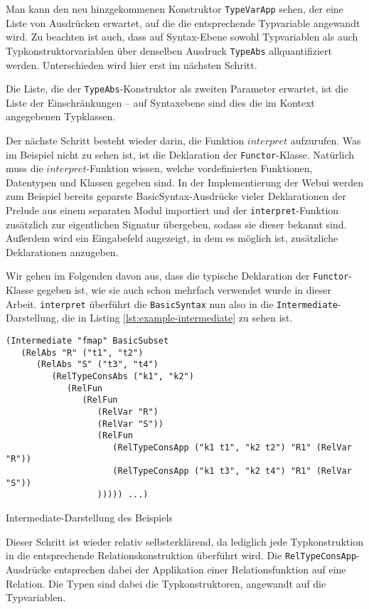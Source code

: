 Man kann den neu hinzgekommenen Konstruktor \texttt{TypeVarApp} sehen, der eine Liste von Ausdrücken erwartet, auf
die die entsprechende Typvariable angewandt wird. Zu beachten ist auch, dass auf Syntax-Ebene sowohl Typvariablen als auch
Typkonstruktorvariablen über denselben Ausdruck \texttt{TypeAbs} allquantifiziert werden. Unterschieden wird hier erst im
nächsten Schritt.

Die Liste, die der \texttt{TypeAbs}-Konstruktor als zweiten Parameter erwartet, ist die Liste der Einschränkungen -- auf Syntaxebene
sind dies die im Kontext angegebenen Typklassen.

Der nächste Schritt besteht wieder darin, die Funktion $interpret$ aufzurufen. Was im Beispiel nicht zu sehen ist, ist die
Deklaration der \texttt{Functor}-Klasse. Natürlich muss die $interpret$-Funktion wissen, welche vordefinierten Funktionen,
Datentypen und Klassen gegeben sind. In der Implementierung der Webui \cite{freetheoremswebui} werden zum Beispiel bereits
geparste BasicSyntax-Ausdrücke vieler Deklarationen der Prelude aus einem separaten Modul importiert und der
\texttt{interpret}-Funktion zusätzlich zur eigentlichen Signatur übergeben, sodass sie dieser bekannt sind.
Außerdem wird ein Eingabefeld angezeigt, in dem es möglich ist, zusätzliche Deklarationen anzugeben.

Wir gehen im Folgenden davon aus, dass die typische Deklaration der \texttt{Functor}-Klasse gegeben ist, wie sie auch schon
mehrfach verwendet wurde in dieser Arbeit.  \texttt{interpret} überführt die \texttt{BasicSyntax} nun also in die
\texttt{Intermediate}-Darstellung, die in Listing \ref{lst:example-intermediate} zu sehen ist.

\begin{listing}[ht]
\begin{verbatim}
(Intermediate "fmap" BasicSubset
   (RelAbs "R" ("t1", "t2")
      (RelAbs "S" ("t3", "t4")
         (RelTypeConsAbs ("k1", "k2")
            (RelFun
               (RelFun
                  (RelVar "R")
                  (RelVar "S"))
                  (RelFun
                     (RelTypeConsApp ("k1 t1", "k2 t2") "R1" (RelVar "R"))
                     (RelTypeConsApp ("k1 t3", "k2 t4") "R1" (RelVar "S"))
                  ))))) ...)
\end{verbatim}
\caption{Intermediate-Darstellung des Beispiels}
\label{lst:example-intermediate}
\end{listing}

Dieser Schritt ist wieder relativ selbsterklärend, da lediglich jede Typkonstruktion in die entsprechende Relationskonstruktion
überführt wird. Die \texttt{RelTypeConsApp}-Ausdrücke entsprechen dabei der Applikation einer Relationsfunktion auf
eine Relation. Die Typen sind dabei die Typkonstruktoren, angewandt auf die Typvariablen.

